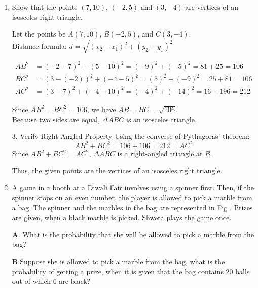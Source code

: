 \begin{enumerate}[label=\thesubsection.\arabic*, ref=\thesubsection.\theenumi]
\begin{center}
\begin{tikzpicture}[scale=0.6, thick]
		\end{tikzpicture}
	\end{center}
	let distance from point to lower point of pedestal be x ; 
	
	$tan 45^\circ = \frac{BC}{AB}=BC=AB=x $
	
	$tan 60^\circ= \frac{BD}{AB}=\sqrt{3}\implies \frac{x+1.6}{x}=\sqrt{3}$
	
	height of pedestal =x=$\frac{1.6}{\sqrt{3}-1}=0.8(\sqrt{3}+1)$
	\item 
	
	Show that the points $(7, 10)$, $(-2, 5)$ and $(3, -4)$ are vertices of an isosceles right triangle.   
	
	\solution 
	

	
	Let the points be $A(7, 10)$, $B(-2, 5)$, and $C(3, -4)$. \\
	Distance formula: $d = \sqrt{(x_2 - x_1)^2 + (y_2 - y_1)^2}$
	
	\begin{align*}
		AB^2 &= (-2 - 7)^2 + (5 - 10)^2 = (-9)^2 + (-5)^2 = 81 + 25 = 106 \\
		BC^2 &= (3 - (-2))^2 + (-4 - 5)^2 = (5)^2 + (-9)^2 = 25 + 81 = 106 \\
		AC^2 &= (3 - 7)^2 + (-4 - 10)^2 = (-4)^2 + (-14)^2 = 16 + 196 = 212
	\end{align*}
	
	Since $AB^2 = BC^2 = 106$, we have $AB = BC = \sqrt{106}$. \\
	Because two sides are equal, $\Delta ABC$ is an isosceles triangle.
	
	3. Verify Right-Angled Property
	Using the converse of Pythagoras' theorem:
	$$
	AB^2 + BC^2 = 106 + 106 = 212 = AC^2
	$$
	Since $AB^2 + BC^2 = AC^2$, $\Delta ABC$ is a right-angled triangle at $B$.
	
	Thus, the given points are the vertices of an isosceles right triangle.
	\newpage
	
	\item A game in a booth at a Diwali Fair involves using a spinner first. Then, if the spinner stops on an even number, the player is allowed to pick a marble from a bag. The spinner and the marbles in the bag are represented in Fig .
	Prizes are given, when a black marble is picked. Shweta plays the game once.
	
	\textbf{A}. What is the probability that she will be allowed to pick a marble from the bag?   
	
	\textbf{B}.Suppose she is allowed to pick a marble from the bag, what is the probability of getting a prize, when it is given that the bag contains 20 balls out of which 6 are black?
	

\end{enumerate}
